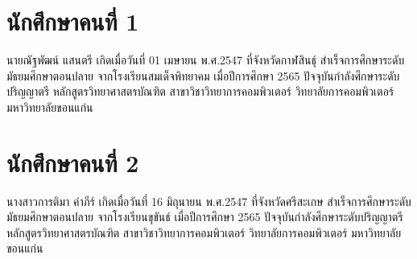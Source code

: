 %

\section*{นักศึกษาคนที่ 1}

นายณัฐพัฒน์ แสนตรี เกิดเมื่อวันที่ 01 เมษายน พ.ศ.2547 ที่จังหวัดกาฬสินธุ์
สำเร็จการศึกษาระดับมัธยมศึกษาตอนปลาย จากโรงเรียนสมเด็จพิทยาคม เมื่อปีการศึกษา 2565
ปัจจุบันกำลังศึกษาระดับปริญญาตรี หลักสูตรวิทยาศาสตรบัณฑิต
สาขาวิชาวิทยาการคอมพิวเตอร์ วิทยาลัยการคอมพิวเตอร์ มหาวิทยาลัยขอนแก่น




\section*{นักศึกษาคนที่ 2}

นางสาวการติมา คำภีร์ เกิดเมื่อวันที่ 16 มิถุนายน พ.ศ.2547 ที่จังหวัดศรีสะเกษ
สำเร็จการศึกษาระดับมัธยมศึกษาตอนปลาย จากโรงเรียนขุขันธ์ เมื่อปีการศึกษา 2565
ปัจจุบันกำลังศึกษาระดับปริญญาตรี หลักสูตรวิทยาศาสตรบัณฑิต
สาขาวิชาวิทยาการคอมพิวเตอร์ วิทยาลัยการคอมพิวเตอร์ มหาวิทยาลัยขอนแก่น
